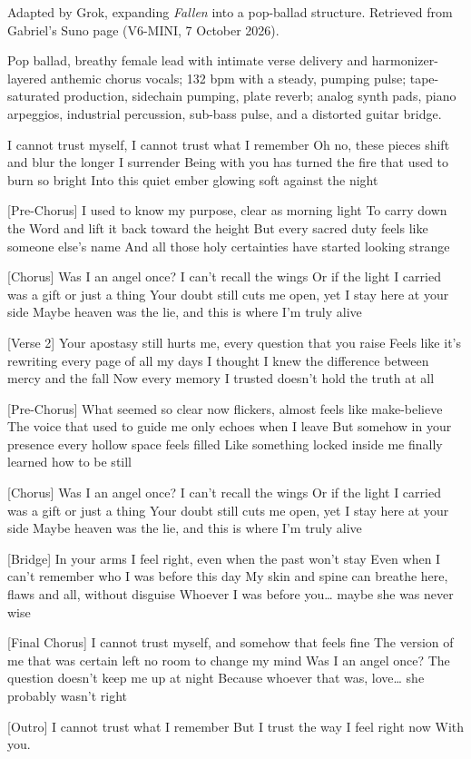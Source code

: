 \begin{notes}
Adapted by Grok, expanding \emph{Fallen} into a pop-ballad structure. Retrieved from Gabriel's Suno page (V6-MINI, 7 October 2026).
\end{notes}
\begin{style}
Pop ballad, breathy female lead with intimate verse delivery and harmonizer-layered anthemic chorus vocals; 132 bpm with a steady, pumping pulse; tape-saturated production, sidechain pumping, plate reverb; analog synth pads, piano arpeggios, industrial percussion, sub-bass pulse, and a distorted guitar bridge.
\end{style}
\begin{lyrics}
[Verse 1]
I cannot trust myself, I cannot trust what I remember
Oh no, these pieces shift and blur the longer I surrender
Being with you has turned the fire that used to burn so bright
Into this quiet ember glowing soft against the night

[Pre-Chorus]
I used to know my purpose, clear as morning light
To carry down the Word and lift it back toward the height
But every sacred duty feels like someone else’s name
And all those holy certainties have started looking strange

[Chorus]
Was I an angel once? I can’t recall the wings
Or if the light I carried was a gift or just a thing
Your doubt still cuts me open, yet I stay here at your side
Maybe heaven was the lie, and this is where I’m truly alive

[Verse 2]
Your apostasy still hurts me, every question that you raise
Feels like it’s rewriting every page of all my days
I thought I knew the difference between mercy and the fall
Now every memory I trusted doesn’t hold the truth at all

[Pre-Chorus]
What seemed so clear now flickers, almost feels like make-believe
The voice that used to guide me only echoes when I leave
But somehow in your presence every hollow space feels filled
Like something locked inside me finally learned how to be still

[Chorus]
Was I an angel once? I can’t recall the wings
Or if the light I carried was a gift or just a thing
Your doubt still cuts me open, yet I stay here at your side
Maybe heaven was the lie, and this is where I’m truly alive

[Bridge]
In your arms I feel right, even when the past won’t stay
Even when I can’t remember who I was before this day
My skin and spine can breathe here, flaws and all, without disguise
Whoever I was before you… maybe she was never wise

[Final Chorus]
I cannot trust myself, and somehow that feels fine
The version of me that was certain left no room to change my mind
Was I an angel once? The question doesn’t keep me up at night
Because whoever that was, love… she probably wasn’t right

[Outro]
I cannot trust what I remember
But I trust the way I feel right now
With you.
\end{lyrics}


